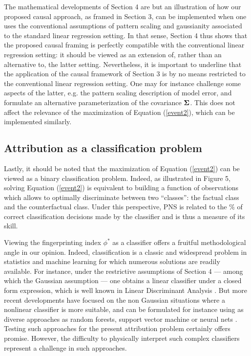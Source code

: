 \documentclass[12pt]{article}
\newcommand{\Sig}{\mbox{\boldmath \(\Sigma\)}}
\begin{document}
The mathematical developments of Section 4 are but an illustration of how our proposed causal approach, as framed in Section 3, can be implemented when one uses the conventional assumptions of pattern scaling and gaussianity associated to the standard linear regression setting. In that sense, Section 4 thus shows that the proposed causal framing is perfectly compatible with the conventional linear regression setting: it should be viewed as an extension of, rather than an alternative to, the latter setting. Nevertheless, it is important to underline that the application of the causal framework of Section 3 is by no means restricted to the conventional linear regression setting. One may for instance challenge some aspects of the latter, e.g. the pattern scaling description of model error, and formulate an alternative parameterization of the covariance $\Sig$. This does not affect the relevance of the maximization of Equation (\ref{event2}), which can be implemented similarly.

\subsection{Attribution as a classification problem}

Lastly, it should be noted that the maximization of Equation (\ref{event2}) can be viewed as a binary classification problem. Indeed, as illustrated in Figure 5, solving Equation (\ref{event2}) is equivalent to building a function of observations which allows to optimally discriminate between two ``classes'': the factual class and the counterfactual class. Under this perspective, PNS is related to the $\%$ of correct classification decisions made by the classifier and is thus a measure of its skill.

Viewing the fingerprinting index $\phi^*$ as a classifier offers a fruitful methodological angle in our opinion. Indeed, classification is a classic and widespread problem in statistics and machine learning for which numerous solutions are readily available. For instance, under the restrictive assumptions of Section 4 --- among which the Gaussian assumption --- one obtains a linear classifier under a closed form expression, which is well known in Linear Discriminant Analysis \citep{McLachlan04}. But more recent developments have focused on the non Gaussian situations where a nonlinear classifier is more suitable, and can be formulated for instance using as diverse approaches as random forests, support vector machine or neural nets \citep{Alp10}. Testing such approaches for the present attribution problem certainly offers promise. However, the difficulty to physically interpret such complex classifiers represent a challenge in such approaches. 
\end{document}
